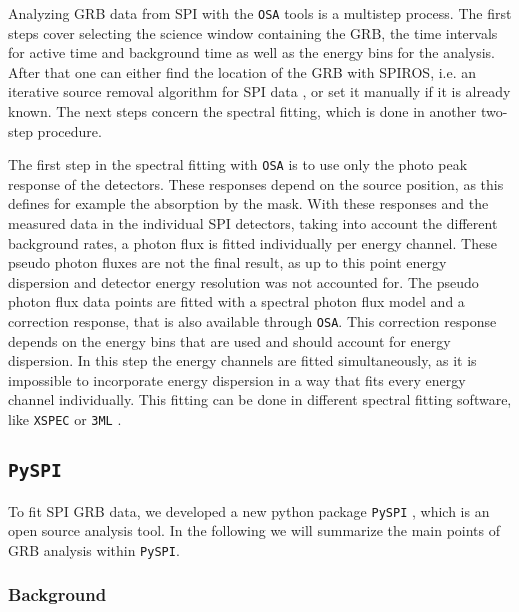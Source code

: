 \documentclass[twocolumn,traditabstract]{aa}
\begin{document}
Analyzing GRB data from SPI with the {\tt OSA} tools is a multistep process. The first steps cover selecting the science window containing the GRB, the time intervals for active time and background time as well as the energy bins for the analysis. After that one can either find the location of the GRB with SPIROS, i.e. an iterative source removal algorithm for SPI data \citep{Skinner-2003}, or set it manually if it is already known. The next steps concern the spectral fitting, which is done in another two-step procedure.

The first step in the spectral fitting with {\tt OSA} is to use only the photo peak response of the detectors. These responses depend on the source position, as this defines for example the absorption by the mask. With these responses and the measured data in the individual SPI detectors, taking into account the different background rates, a photon flux is fitted individually per energy channel. These pseudo photon fluxes are not the final result, as up to this point energy dispersion and detector energy resolution was not accounted for.
The pseudo photon flux data points are fitted with a spectral photon flux model and a correction response, that is also available through {\tt OSA}. This correction response depends on the energy bins that are used and should account for energy dispersion. In this step the energy channels are fitted simultaneously, as it is impossible to incorporate energy dispersion in a way that fits every energy channel individually. This fitting can be done in different spectral fitting software, like {\tt XSPEC} \citep{xspec} or {\tt 3ML} \citep{3ML}.


\subsection{{\tt PySPI}}
\label{pyspi}
To fit SPI GRB data, we developed a new python package {\tt PySPI} \citep{joss}, which is an open source analysis tool. In the following we will summarize the main points of GRB analysis within {\tt PySPI}.

\subsubsection{Background}
\end{document}

